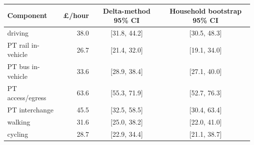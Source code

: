 \begin{tabular}{lrcc}
\toprule
Component & \pounds/hour & Delta-method 95\% CI & Household bootstrap 95\% CI \\
\midrule
driving & 38.0 & [31.8, 44.2] & [30.5, 48.3] \\
PT rail in-vehicle & 26.7 & [21.4, 32.0] & [19.1, 34.0] \\
PT bus in-vehicle & 33.6 & [28.9, 38.4] & [27.1, 40.0] \\
PT access/egress & 63.6 & [55.3, 71.9] & [52.7, 76.3] \\
PT interchange & 45.5 & [32.5, 58.5] & [30.4, 63.4] \\
walking & 31.6 & [25.0, 38.2] & [22.0, 41.0] \\
cycling & 28.7 & [22.9, 34.4] & [21.1, 38.7] \\
\bottomrule
\end{tabular}
